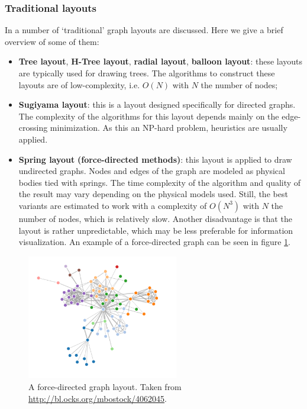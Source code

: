 \subsubsection{Traditional layouts}\label{chapter:literature_study:section:interaction:subsection:graphs:subsubsection:traditional}

In \cite{herman:2000} a number of ‘traditional’ graph layouts are discussed. Here we give a brief overview of some of them:

\begin{itemize}
	\item \textbf{Tree layout}, \textbf{H-Tree layout}, \textbf{radial layout}, \textbf{balloon layout}: these layouts are typically used for drawing trees. The algorithms to construct these layouts are of low-complexity, i.e. $O(N)$ with $N$ the number of nodes;
	\item \textbf{Sugiyama layout}: this is a layout designed specifically for directed graphs. The complexity of the algorithms for this layout depends mainly on the edge-crossing minimization. As this an NP-hard problem, heuristics are usually applied.
	\item \textbf{Spring layout} \textbf{(force-directed methods)}: this layout is applied to draw undirected graphs. Nodes and edges of the graph are modeled as physical bodies tied with springs. The time complexity of the algorithm and quality of the result may vary depending on the physical models used. Still, the best variants are estimated to work with a complexity of $O(N^{3})$ with $N$ the number of nodes, which is relatively slow. Another disadvantage is that the layout is rather unpredictable, which may be less preferable for information visualization. An example of a force-directed graph can be seen in figure \ref{figure:forcedirected_layout}.
\end{itemize}

\begin{figure}%
	\begin{center}
		\includegraphics[width=250px]{img/force-directed_graph}%
	\end{center}
\caption{A force-directed graph layout. Taken from \url{http://bl.ocks.org/mbostock/4062045}.}%
\label{figure:forcedirected_layout}%
\end{figure}


